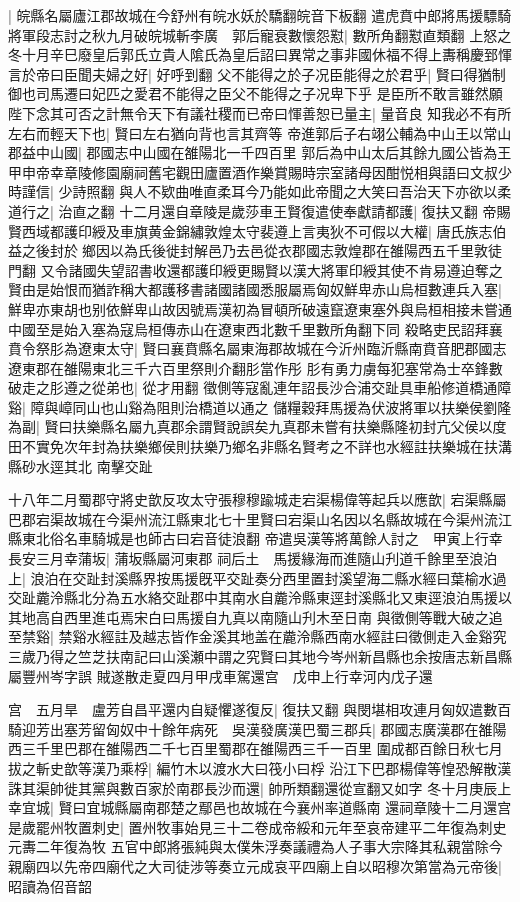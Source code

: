 |{
	皖縣名屬廬江郡故城在今舒州有皖水妖於驕翻皖音下板翻}
遣虎賁中郎將馬援驃騎將軍段志討之秋九月破皖城斬李廣　郭后寵衰數懷怨懟|{
	數所角翻懟直類翻}
上怒之冬十月辛巳廢皇后郭氏立貴人隂氏為皇后詔曰異常之事非國休福不得上夀稱慶郅惲言於帝曰臣聞夫婦之好|{
	好呼到翻}
父不能得之於子况臣能得之於君乎|{
	賢曰得猶制御也司馬遷曰妃匹之愛君不能得之臣父不能得之子况卑下乎}
是臣所不敢言雖然願陛下念其可否之計無令天下有議社稷而已帝曰惲善恕已量主|{
	量音良}
知我必不有所左右而輕天下也|{
	賢曰左右猶向背也言其齊等}
帝進郭后子右翊公輔為中山王以常山郡益中山國|{
	郡國志中山國在雒陽北一千四百里}
郭后為中山太后其餘九國公皆為王　甲申帝幸章陵修園廟祠舊宅觀田廬置酒作樂賞賜時宗室諸母因酣悦相與語曰文叔少時謹信|{
	少詩照翻}
與人不欵曲唯直柔耳今乃能如此帝聞之大笑曰吾治天下亦欲以柔道行之|{
	治直之翻}
十二月還自章陵是歲莎車王賢復遣使奉獻請都護|{
	復扶又翻}
帝賜賢西域都護印綬及車旗黄金錦繡敦煌太守裴遵上言夷狄不可假以大權|{
	唐氏族志伯益之後封於鄉因以為氏後徙封解邑乃去邑從衣郡國志敦煌郡在雒陽西五千里敦徒門翻}
又令諸國失望詔書收還都護印綬更賜賢以漢大將軍印綬其使不肯易遵迫奪之賢由是始恨而猶詐稱大都護移書諸國諸國悉服屬焉匈奴鮮卑赤山烏桓數連兵入塞|{
	鮮卑亦東胡也别依鮮卑山故因號焉漢初為冒頓所破遠竄遼東塞外與烏桓相接未嘗通中國至是始入塞為寇烏桓傳赤山在遼東西北數千里數所角翻下同}
殺略吏民詔拜襄賁令祭肜為遼東太守|{
	賢曰襄賁縣名屬東海郡故城在今沂州臨沂縣南賁音肥郡國志遼東郡在雒陽東北三千六百里祭則介翻肜當作彤}
肜有勇力虜每犯塞常為士卒鋒數破走之肜遵之從弟也|{
	從才用翻}
徵側等寇亂連年詔長沙合浦交趾具車船修道橋通障谿|{
	障與嶂同山也山谿為阻則治橋道以通之}
儲糧穀拜馬援為伏波將軍以扶樂侯劉隆為副|{
	賢曰扶樂縣名屬九真郡余謂賢說誤矣九真郡未嘗有扶樂縣隆初封亢父侯以度田不實免次年封為扶樂鄉侯則扶樂乃鄉名非縣名賢考之不詳也水經註扶樂城在扶溝縣砂水逕其北}
南擊交趾

十八年二月蜀郡守將史歆反攻太守張穆穆踰城走宕渠楊偉等起兵以應歆|{
	宕渠縣屬巴郡宕渠故城在今渠州流江縣東北七十里賢曰宕渠山名因以名縣故城在今渠州流江縣東北俗名車騎城是也師古曰宕音徒浪翻}
帝遣吳漢等將萬餘人討之　甲寅上行幸長安三月幸蒲坂|{
	蒲坂縣屬河東郡}
祠后土　馬援緣海而進隨山刋道千餘里至浪泊上|{
	浪泊在交趾封溪縣界按馬援旣平交趾奏分西里置封溪望海二縣水經曰葉榆水過交趾麊泠縣北分為五水絡交趾郡中其南水自麊泠縣東逕封溪縣北又東逕浪泊馬援以其地高自西里進屯焉宋白曰馬援自九真以南隨山刋木至日南}
與徵側等戰大破之追至禁谿|{
	禁谿水經註及越志皆作金溪其地盖在麊泠縣西南水經註曰徵側走入金谿究三歲乃得之竺芝扶南記曰山溪瀬中謂之究賢曰其地今岑州新昌縣也余按唐志新昌縣屬豐州岑字誤}
賊遂散走夏四月甲戌車駕還宫　戊申上行幸河内戊子還

宫　五月旱　盧芳自昌平還内自疑懼遂復反|{
	復扶又翻}
與閔堪相攻連月匈奴遣數百騎迎芳出塞芳留匈奴中十餘年病死　吳漢發廣漢巴蜀三郡兵|{
	郡國志廣漢郡在雒陽西三千里巴郡在雒陽西二千七百里蜀郡在雒陽西三千一百里}
圍成都百餘日秋七月拔之斬史歆等漢乃乘桴|{
	編竹木以渡水大曰筏小曰桴}
沿江下巴郡楊偉等惶恐解散漢誅其渠帥徙其黨與數百家於南郡長沙而還|{
	帥所類翻還從宣翻又如字}
冬十月庚辰上幸宜城|{
	賢曰宜城縣屬南郡楚之鄢邑也故城在今襄州率道縣南}
還祠章陵十二月還宫　是歲罷州牧置刺史|{
	置州牧事始見三十二卷成帝綏和元年至哀帝建平二年復為刺史元夀二年復為牧}
五官中郎將張純與太僕朱浮奏議禮為人子事大宗降其私親當除今親廟四以先帝四廟代之大司徒涉等奏立元成哀平四廟上自以昭穆次第當為元帝後|{
	昭讀為佋音韶}


